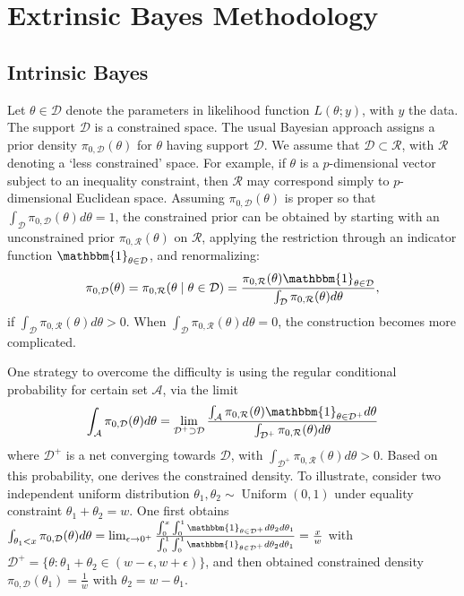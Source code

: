 \documentclass[10pt]{article}
\newcommand{\mc}[1]{\mathcal{#1}}
\DeclareMathOperator{\U}{Uniform}
\DeclareMathOperator{\1}{\mathbbm{1}}
\begin{document}
\section{Extrinsic Bayes Methodology}
\subsection{Intrinsic Bayes}
Let $\theta \in \mc D$ denote the parameters in likelihood function $L(\theta;y)$, with $y$ the data. The support $\mc D$ is a constrained space. The usual Bayesian approach assigns a prior density $\pi_{0,\mc D}(\theta)$ for $\theta$ having support $\mc D$. We assume that $\mc D \subset \mc R$, with $\mc R$ denoting a `less constrained' space. For example, if $\theta$ is a $p$-dimensional vector subject to an inequality constraint, then $\mc R$ may correspond simply to $p$-dimensional Euclidean space.
Assuming $\pi_{0,\mc D}(\theta)$ is proper so that $\int_{\mc D} \pi_{0,\mc D}(\theta) d\theta =1$, the constrained prior can be obtained by starting with an unconstrained prior $\pi_{0,\mc R}(\theta)$ on $\mc R$, applying the restriction through an indicator function $\mathbbm{1}_{\theta\in \mc D}$, and renormalizing:
\begin{equation}
\begin{aligned}
\label{exact_prior1}
\pi_{0,\mc D}(\theta)= \pi_{0,\mc R}(\theta \mid \theta \in \mc D) = \frac{ \pi_{0,\mc R}(\theta) \mathbbm{1}_{\theta\in \mc D} }{ \int_{\mc D} \pi_{0,\mc R}(\theta)d\theta },
\end{aligned}
\end{equation}
if $ \int_{\mc D} \pi_{0,\mc R}(\theta)d\theta >0$. When $ \int_{\mc D} \pi_{0,\mc R}(\theta)d\theta =0$, the construction becomes more complicated.

 One strategy to overcome the difficulty is using the regular conditional probability for certain set $\mc A$, via the limit
\begin{equation}
\begin{aligned}
\label{exact_prior2}
\int_{\mc A} \pi_{0,\mc D}(\theta) d\theta=\lim_{\mc D^+\supset \mc D} \frac{\int_{\mc A} \pi_{0,\mc R}(\theta) \mathbbm{1}_{\theta\in \mc D^+ } d\theta}{ \int_{\mc D^+} \pi_{0,\mc R}(\theta)d\theta }\end{aligned}
\end{equation}
where $\mc D^+$ is a net converging towards $\mc D$, with $\int_{\mc D^+} \pi_{0,\mc R}(\theta)d\theta>0$. Based on this probability, one derives the constrained density. To illustrate, consider two independent uniform distribution $\theta_1,\theta_2 \sim \U(0,1)$ under equality constraint $\theta_1+\theta_2=w$. One first obtains $\int_{\theta_1<x}\pi_{0,\mc D}(\theta) d\theta=\lim_{\epsilon\rightarrow 0^+} \frac{ \int_0^{x} \int_0^1 \mathbbm{1}_{\theta\in \mc D^+}  d\theta_2d\theta_1} { \int_0^1 \int_0^1 \mathbbm{1}_{\theta\in \mc D^+}  d\theta_2d\theta_1 } =\frac{x}{w}$ with $\mc D^+= \{ \theta: \theta_1+\theta_2\in (w-\epsilon, w+\epsilon)\}$, and then obtained constrained density $\pi_{0,\mc D}(\theta_1)= \frac{1}{w}$ with $\theta_2=w-\theta_1$.
\end{document}
